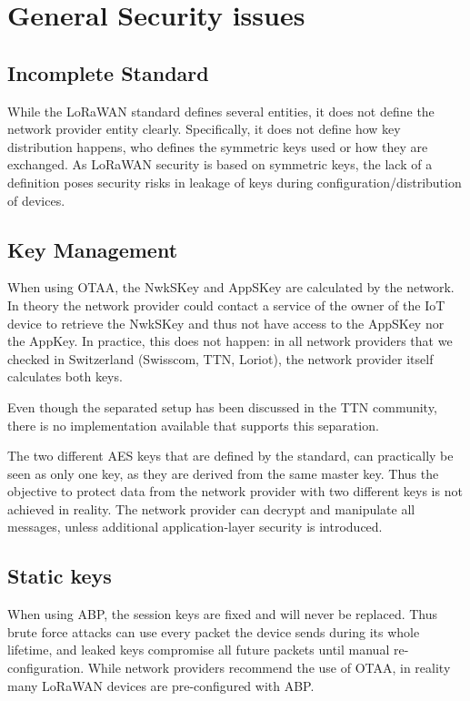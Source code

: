 \chapter{General Security issues}

\section{Incomplete Standard}

{While the LoRaWAN standard defines several entities, it does not define
the network provider entity clearly. Specifically, it does not define
how key distribution happens, who defines the symmetric keys used or how
they are exchanged. As LoRaWAN security is based on symmetric keys, the
lack of a definition poses security risks in leakage of keys during
configuration/distribution of devices.}

\section{Key Management}

{When using OTAA, the NwkSKey and AppSKey are calculated by the network.
In theory the network provider could contact a service of the owner of
the IoT device to retrieve the NwkSKey and thus not have access to the
AppSKey nor the AppKey. In practice, this does not happen: in all
network providers that we checked in Switzerland (Swisscom, TTN,
Loriot), the network provider itself calculates both keys.}

{Even though the separated setup has been discussed in the TTN
community, there is no implementation available that supports this
separation.}

{The two different AES keys that are defined by the standard, can
practically be seen as only one key, as they are derived from the same
master key. Thus the objective to protect data from the network provider
with two different keys is not achieved in reality. The network provider
can decrypt and manipulate all messages, unless additional
application-layer security is introduced.}

\section{\texorpdfstring{{Static
keys}}{Static keys}}\label{h.1g22hul9yfrw}

When using ABP, the session keys are fixed and will never be replaced.
Thus brute force attacks can use every packet the device sends during
its whole lifetime, and leaked keys compromise all future packets until
manual re-configuration.  While network providers
recommend the use of OTAA, in reality many LoRaWAN devices are pre-configured with ABP.


